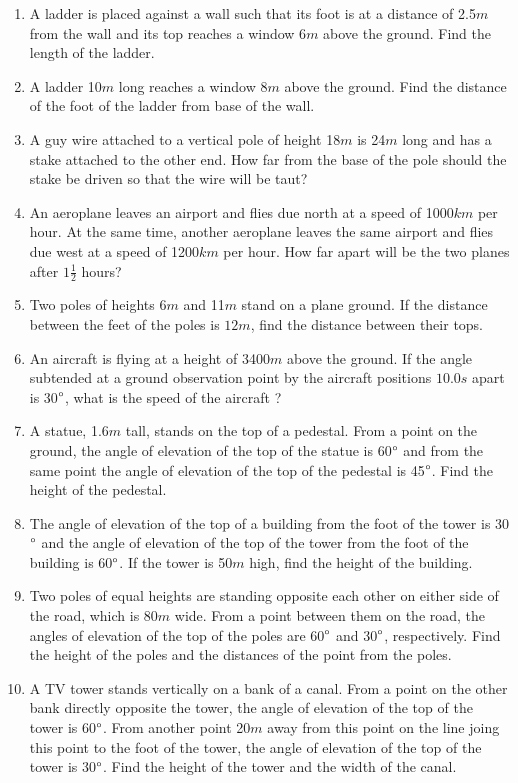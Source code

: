 \begin{enumerate}[label=\thesubsection.\arabic*.,ref=\thesubsection.\theenumi]
\item A ladder is placed against a wall such that its foot is at a distance of 2.5$m$ from the wall and its top reaches a window 6$m$ above the ground. Find the length of the ladder.
\item  A ladder 10$m$ long reaches a window 8$m$ above the ground. Find the distance of the foot of the ladder from base of the wall.
\item  A guy wire attached to a vertical pole of height 18$m$ is 24$m$ long and has a stake attached to the other end. How far from the base of the pole should the stake be driven so that the wire will be taut?
\item  An aeroplane leaves an airport and flies due north at a speed of 1000$km$ per hour. At the same time, another aeroplane leaves the same airport and flies due west at a speed of 1200$km$ per hour. How far apart will be the two planes after $1\frac{1}{2}$ hours?
\item  Two poles of heights 6$m$ and 11$m$ stand on a plane ground. If the distance between the feet of the poles is $12m$, find the distance between their tops.
\item An aircraft is flying at a height of 3400$m$ above the ground. If the angle subtended at a ground observation point by the aircraft positions $10.0s$ apart is 30$\degree$, what is the speed of the aircraft ?
%
\item A statue, 1.6$m$ tall, stands on the top of a pedestal. From a point on the ground, the angle of elevation of the top of the statue is 60$\degree$ and from the same point the angle of elevation of the top of the pedestal is 45$\degree$. Find the height of the pedestal.
\item The angle of elevation of the top of a building from the foot of the tower is 30$\degree$ and the angle of elevation of the top of the tower from the foot of the building is 60$\degree$. If the tower is 50$m$ high, find the height of the building.
\item Two poles of equal heights are standing opposite each other on either side of the road, which is 80$m$ wide. From a point between them on the road, the angles of elevation of the top of the poles are 60$\degree$ and 30$\degree$, respectively. Find the height of the poles and the distances of the point from the poles.
\item A TV tower stands vertically on a bank of a canal. From a point on the other bank directly opposite the tower, the angle of elevation of the top of the tower is 60$\degree$. From another point 20$m$ away from this point on the line joing this point to the foot of the tower, the angle of elevation of the top of the tower is 30$\degree$. Find the height of the tower and the width of the canal.

\end{enumerate}
